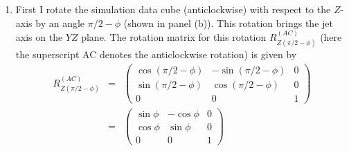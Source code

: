 \begin{appendices}
%
%
%  
\begin{enumerate}
\item First I rotate the simulation data cube (anticlockwise) with respect to the $Z$-axis by an angle $\pi/2 - \phi$ (shown in panel (b)). %
This rotation brings the jet axis on the $YZ$ plane. The rotation matrix for this rotation $R^{(AC)}_{Z(\pi/2 - \phi)}$ (here the superscript AC denotes the anticlockwise rotation) is given by 
\begin{eqnarray}
R^{(AC)}_{Z(\pi/2 - \phi)}  &=& \begin{pmatrix}
 \cos(\pi/2 - \phi) & -\sin(\pi/2 - \phi) & 0 \\
\sin(\pi/2 - \phi) & \cos(\pi/2 - \phi) & 0 \\
0 & 0 & 1
\end{pmatrix} \nonumber \\
&=& \begin{pmatrix}
 \sin\phi & -\cos\phi & 0 \\
\cos\phi & \sin\phi & 0 \\
0 & 0 & 1
\end{pmatrix} 

\end{eqnarray}
\end{enumerate}
\end{appendices}
